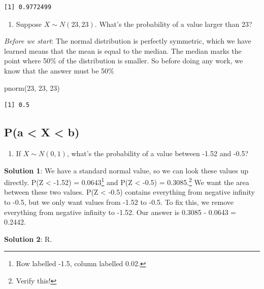 \documentclass[
  letterpaper,
  DIV=11,
  numbers=noendperiod]{scrreprt}
\newenvironment{Shaded}{\begin{snugshade}}{\end{snugshade}}
\newcommand{\DecValTok}[1]{\textcolor[rgb]{0.68,0.00,0.00}{#1}}
\newcommand{\FunctionTok}[1]{\textcolor[rgb]{0.28,0.35,0.67}{#1}}
\newcommand{\NormalTok}[1]{\textcolor[rgb]{0.00,0.23,0.31}{#1}}
\providecommand{\tightlist}{%
  \setlength{\itemsep}{0pt}\setlength{\parskip}{0pt}}\usepackage{longtable,booktabs,array}
\begin{document}
\begin{verbatim}
[1] 0.9772499
\end{verbatim}

\begin{enumerate}
\def\labelenumi{\arabic{enumi}.}
\setcounter{enumi}{3}
\tightlist
\item
  Suppose \(X\sim N(23, 23)\). What's the probability of a value larger
  than 23?
\end{enumerate}

\emph{Before we start}: The normal distribution is perfectly symmetric,
which we have learned means that the mean is equal to the median. The
median marks the point where 50\% of the distribution is smaller. So
before doing any work, we know that the answer must be 50\%

\begin{Shaded}
\begin{Highlighting}[]
\FunctionTok{pnorm}\NormalTok{(}\DecValTok{23}\NormalTok{, }\DecValTok{23}\NormalTok{, }\DecValTok{23}\NormalTok{)}
\end{Highlighting}
\end{Shaded}

\begin{verbatim}
[1] 0.5
\end{verbatim}

\hypertarget{pa-x-b}{%
\subsection{P(a \textless{} X \textless{} b)}\label{pa-x-b}}

\begin{enumerate}
\def\labelenumi{\arabic{enumi}.}
\setcounter{enumi}{4}
\tightlist
\item
  If \(X\sim N(0, 1)\), what's the probability of a value between -1.52
  and -0.5?
\end{enumerate}

\textbf{Solution 1}: We have a standard normal value, so we can look
these values up directly. P(Z \textless{} -1.52) = 0.0643\footnote{Row
  labelled -1.5, column labelled 0.02.} and P(Z \textless{} -0.5) =
0.3085.\footnote{Verify this!} We want the area between these two
values. P(Z \textless{} -0.5) contains everything from negative infinity
to -0.5, but we only want values from -1.52 to -0.5. To fix this, we
remove everything from negative infinity to -1.52. Our answer is 0.3085
- 0.0643 = 0.2442.

\textbf{Solution 2}: R.
\end{document}
